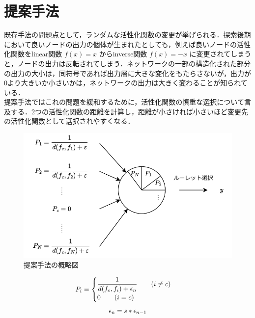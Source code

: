 \section{提案手法}
既存手法の問題点として，ランダムな活性化関数の変更が挙げられる．探索後期において良いノードの出力の個体が生まれたとしても，例えば良いノードの活性化関数をlinear関数 $ f(x) = x $ からinverse関数 $ f(x) = -x $ に変更されてしまうと，ノードの出力は反転されてしまう．ネットワークの一部の構造化された部分の出力の大小は，同符号であれば出力層に大きな変化をもたらさないが，出力が0より大きいか小さいかは，ネットワークの出力は大きく変わることが知られている\cite{WANN}．\\
提案手法ではこれの問題を緩和するために，活性化関数の慎重な選択について言及する．2つの活性化関数の距離を計算し，距離が小さければ小さいほど変更先の活性化関数として選択されやすくなる．

\begin{figure}[h]
    \begin{center}
        \includegraphics[scale=0.8]{img/exppropose.pdf}
        \caption{提案手法の概略図}
    \end{center}
\end{figure}

\begin{equation}
    P_{i} =  \begin{cases} \dfrac{1}{d(f_{c}, f_{i}) + \epsilon_{n} } \qquad (i \neq c) \\ 0 \qquad (i = c) \end{cases}\\
\end{equation}
\begin{equation}
    \epsilon_{n} = s * \epsilon_{n-1} \\
\end{equation}

